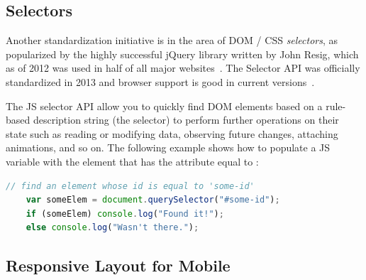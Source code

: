 \subsection{Selectors}
\label{sec:bgselectors}
Another standardization initiative is in the area of DOM / CSS \textit{selectors},
as popularized by the highly successful jQuery library
written by John Resig, 
which as of 2012 was used in half of all major websites~\cite{matthiasgelbmann2012}.
The Selector API was officially standardized in 2013 and browser support is good in current versions~\cite{w3ccontributors2013}.

The JS selector API allow you to quickly find DOM elements based on a rule-based description string (the selector) to perform further operations on their state such as reading or modifying data, observing future changes, attaching animations, and so on. 
The following example shows how to populate a JS variable with the element that has the  attribute equal to :
\begin{lstlisting}[language=JavaScript,caption={JavaScript query selector example.}]
	// find an element whose id is equal to 'some-id'
	var someElem = document.querySelector("#some-id");
	if (someElem) console.log("Found it!");
	else console.log("Wasn't there.");
\end{lstlisting}









\subsection{Responsive Layout for Mobile}

